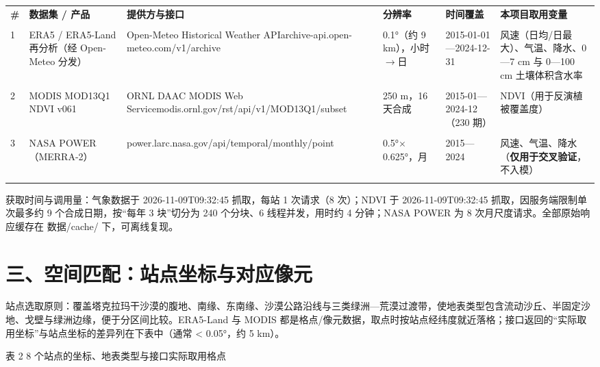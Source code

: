 \documentclass[11pt,a4paper]{ctexart}
\begin{document}
\begin{table}[H]\centering\small\setlength{\parskip}{2pt}
\begin{tabularx}{\textwidth}{|X|X|X|X|X|X|}
\toprule
\textbf{\#} & \textbf{数据集 / 产品} & \textbf{提供方与接口} & \textbf{分辨率} & \textbf{时间覆盖} & \textbf{本项目取用变量} \\\\
\midrule
1 & ERA5 / ERA5-Land 再分析（经 Open-Meteo 分发） & Open-Meteo Historical Weather APIarchive-api.open-meteo.com/v1/archive & 0.1°（约 9 km），小时$\to$日 & 2015-01-01—2024-12-31 & 风速（日均/日最大）、气温、降水、0—7 cm 与 0—100 cm 土壤体积含水率 \\\\
2 & MODIS MOD13Q1 NDVI v061 & ORNL DAAC MODIS Web Servicemodis.ornl.gov/rst/api/v1/MOD13Q1/subset & 250 m，16 天合成 & 2015-01—2024-12（230 期） & NDVI（用于反演植被覆盖度） \\\\
3 & NASA POWER（MERRA-2） & power.larc.nasa.gov/api/temporal/monthly/point & 0.5°$\times$0.625°，月 & 2015—2024 & 风速、气温、降水（\textbf{仅用于交叉验证}，不入模） \\\\
\bottomrule
\end{tabularx}
\end{table}
获取时间与调用量：气象数据于 2026-11-09T09:32:45 抓取，每站 1 次请求（8 次）；NDVI 于 2026-11-09T09:32:45 抓取，因服务端限制单次最多约 9 个合成日期，按“每年 3 块”切分为 240 个分块、6 线程并发，用时约 4 分钟；NASA POWER 为 8 次月尺度请求。全部原始响应缓存在 数据/cache/ 下，可离线复现。


\section*{三、空间匹配：站点坐标与对应像元}
站点选取原则：覆盖塔克拉玛干沙漠的腹地、南缘、东南缘、沙漠公路沿线与三类绿洲—荒漠过渡带，使地表类型包含流动沙丘、半固定沙地、戈壁与绿洲边缘，便于分区间比较。ERA5-Land 与 MODIS 都是格点/像元数据，取点时按站点经纬度就近落格；接口返回的“实际取用坐标”与站点坐标的差异列在下表中（通常 < 0.05°，约 5 km）。

表 2  8 个站点的坐标、地表类型与接口实际取用格点
\end{document}
